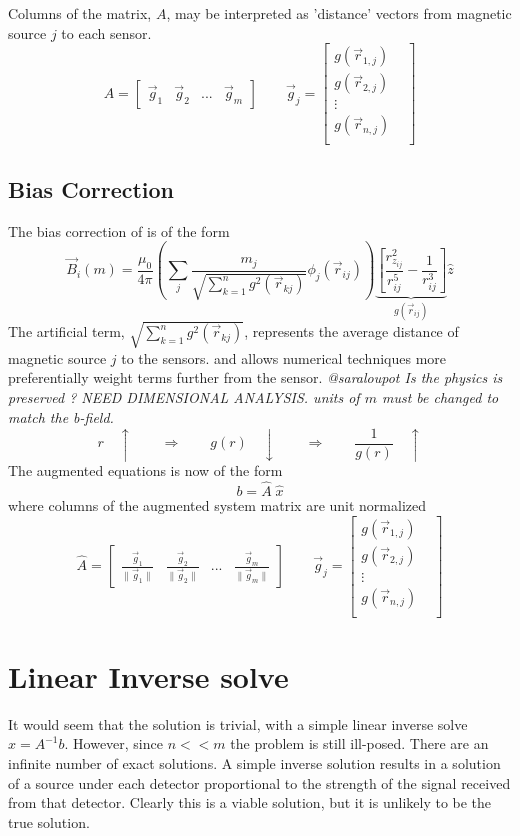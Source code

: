 \documentclass[a4paper]{article}
\begin{document}
Columns of the matrix, $A$, may be interpreted as 'distance' vectors  from
magnetic source $j$ to each sensor.
\[
A = 
\begin{bmatrix}
 \vec{g}_1
 &
 \vec{g}_2
 &
 ...
 &
 \vec{g}_m
\end{bmatrix}
\qquad
\vec{g}_j
 = 
\begin{bmatrix} 
g(\vec{r}_{1,j}) & \\
g(\vec{r}_{2,j}) & \\
\vdots           & \\
g(\vec{r}_{n,j}) & \\
\end{bmatrix} 
\]


\subsection{Bias Correction }
The bias correction of \cite{Gorodnitsky} is of the form
 \[
\vec{B}_i(m)=\frac{\mu_{0}}{4\pi}
  \left(\sum_j  \frac{m_j}{\sqrt{\sum_{k=1}^n  g^2 (\vec{r}_{kj})}}  \phi_j(\vec{r}_{ij})\right)
  \underbrace{
   \left[
       \frac{r_{z_{ij}}^{2}}{r^{5}_{ij}}-\frac{1}{r^{3}_{ij}}
   \right]
   }_{g(\vec{r}_{ij})}
 \hat{z}
\]
The artificial term, $\sqrt{\sum_{k=1}^n  g^2 (\vec{r}_{kj})}$,
represents the average distance of magnetic source $j$ to the sensors.
 and allows numerical techniques more preferentially weight terms further from the sensor.
\textit{\color{red} @saraloupot
Is the physics is preserved ? NEED DIMENSIONAL ANALYSIS.
units of $m$ must be changed to match the b-field. } 
\[
  r \quad \uparrow 
\qquad \Rightarrow \qquad
  g(r) \quad \downarrow 
\qquad \Rightarrow \qquad
  \frac{1}{g(r)} \quad \uparrow 
\]
The augmented equations is now of the form
\[
b = \hat{A} \; \hat{x}
\]
where columns of the augmented system matrix are unit normalized
\[
\hat{A} = 
\begin{bmatrix}
 \frac{\vec{g}_1}{\|\vec{g}_1\|}
 &
 \frac{\vec{g}_2}{\|\vec{g}_2\|}
 &
 ...
 &
 \frac{\vec{g}_m}{\|\vec{g}_m\|}
\end{bmatrix}
\qquad
\vec{g}_j
 = 
\begin{bmatrix} 
g(\vec{r}_{1,j}) & \\
g(\vec{r}_{2,j}) & \\
\vdots           & \\
g(\vec{r}_{n,j}) & \\
\end{bmatrix} 
\]


\section{Linear Inverse solve}
It would seem that the solution is trivial, with a simple linear inverse solve $x=A^{-1}b$.  However, since $n<<m$ the problem is still ill-posed.  There are an infinite number of exact solutions.  A simple inverse solution results in a solution of a source under each detector proportional to the strength of the signal received from that detector.  Clearly this is a viable solution, but it is unlikely to be the true solution.  
\end{document}
